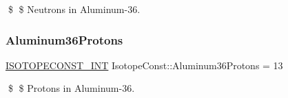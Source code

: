 \$ \$ Neutrons in Aluminum-\/36. \mbox{\label{group___isotope_const-_aluminum-_al36_gab9b38b7bcb5a9df17be0bfedd507dce9}} 
\subsubsection{\texorpdfstring{Aluminum36\+Protons}{Aluminum36Protons}}
{\footnotesize\ttfamily \mbox{\hyperlink{group___isotope_const-_macros_ga5f18360b3e99483a35c32d789e62621c}{I\+S\+O\+T\+O\+P\+E\+C\+O\+N\+S\+T\+\_\+\+I\+NT}} Isotope\+Const\+::\+Aluminum36\+Protons = 13}

\$ \$ Protons in Aluminum-\/36. 